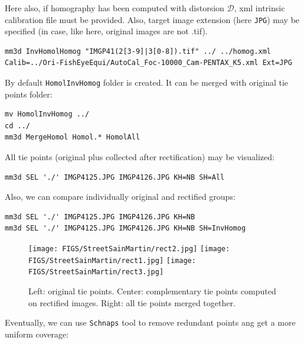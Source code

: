 \noindent Here also, if homography has been computed with distorsion $\mathcal{D}$, xml intrinsic calibration file must be provided. Also, target image extension (here \texttt{JPG}) may be specified (in case, like here, original images are not .tif). \newline

\begin{verbatim}
mm3d InvHomolHomog "IMGP41(2[3-9]|3[0-8]).tif" ../ ../homog.xml
Calib=../Ori-FishEyeEqui/AutoCal_Foc-10000_Cam-PENTAX_K5.xml Ext=JPG
\end{verbatim} 


\noindent By default \texttt{HomolInvHomog} folder is created. It can be merged with original tie points folder: \newline

\begin{verbatim}
mv HomolInvHomog ../
cd ../
mm3d MergeHomol Homol.* HomolAll
\end{verbatim} 

\noindent All tie points (original plus collected after rectification) may be visualized: \newline

\begin{verbatim}
mm3d SEL './' IMGP4125.JPG IMGP4126.JPG KH=NB SH=All
\end{verbatim} 

\noindent Also, we can compare individually original and rectified groups: \newline

\begin{verbatim}
mm3d SEL './' IMGP4125.JPG IMGP4126.JPG KH=NB
mm3d SEL './' IMGP4125.JPG IMGP4126.JPG KH=NB SH=InvHomog
\end{verbatim} 

\begin{figure}[!h]
	\begin{center}
		\texttt{[image: FIGS/StreetSainMartin/rect2.jpg]}
		\texttt{[image: FIGS/StreetSainMartin/rect1.jpg]}
		\texttt{[image: FIGS/StreetSainMartin/rect3.jpg]}
		\caption{Left: original tie points. Center: complementary tie points computed on rectified images. Right: all tie points merged together.}
	\end{center}	
\end{figure}

\noindent Eventually, we can use \texttt{Schnaps} tool to remove redundant points ang get a more uniform coverage: \newline

